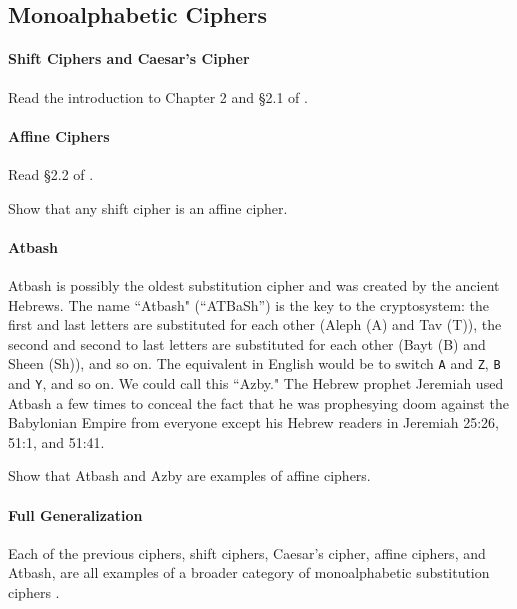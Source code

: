 		\subsection{Monoalphabetic Ciphers}
			\paragraph*{Shift Ciphers and Caesar's Cipher} Read the introduction to Chapter 2 and \S 2.1 of \cite {tw}.

			\paragraph*{Affine Ciphers} Read \S 2.2 of \cite {tw}.

\begin{problem} [10 points]
Show that any shift cipher is an affine cipher.
\end{problem}

			\paragraph*{Atbash} Atbash  is possibly the oldest substitution cipher and was created by the ancient Hebrews. The name ``Atbash" (``ATBaSh'') is the key to the cryptosystem: the first and last letters are substituted for each other (Aleph (A) and Tav (T)), the second and second to last letters are substituted for each other (Bayt (B) and Sheen (Sh)), and so on. The equivalent in English would be to switch {\tt A} and {\tt Z}, {\tt B} and {\tt Y}, and so on. We could call this ``Azby." The Hebrew prophet Jeremiah used Atbash a few times to conceal the fact that he was prophesying doom against the Babylonian Empire from everyone except his Hebrew readers in Jeremiah 25:26, 51:1, and 51:41.


\begin{problem} [10 points]
Show that Atbash and Azby are examples of affine ciphers.
\end{problem}


			\paragraph*{Full Generalization} Each of the previous ciphers, shift ciphers, Caesar's cipher, affine ciphers, and Atbash, are all examples of a broader category of monoalphabetic substitution ciphers .


